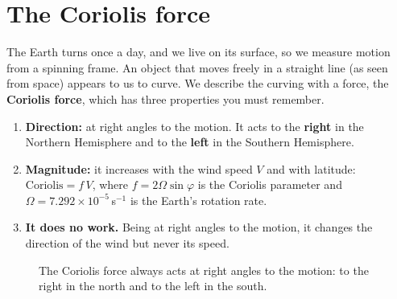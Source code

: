 \section{The Coriolis force}

The Earth turns once a day, and we live on its surface, so we measure motion from a spinning frame. An object that moves freely in a straight line (as seen from space) appears to us to curve. We describe the curving with a force, the \textbf{Coriolis force}, which has three properties you must remember.

\begin{enumerate}[label=\textbf{\arabic*.},itemsep=2pt]
\item \textbf{Direction:} at right angles to the motion. It acts to the \textbf{right} in the Northern Hemisphere and to the \textbf{left} in the Southern Hemisphere.
\item \textbf{Magnitude:} it increases with the wind speed $V$ and with latitude: $\text{Coriolis}=f\,V$, where $f=2\Omega\sin\varphi$ is the Coriolis parameter and $\Omega=7.292\times10^{-5}$\,s$^{-1}$ is the Earth's rotation rate.
\item \textbf{It does no work.} Being at right angles to the motion, it changes the direction of the wind but never its speed.
\end{enumerate}

\begin{figure}[ht]
\centering
\begin{minipage}{0.48\textwidth}
\centering
{}
\end{minipage}
\begin{minipage}{0.48\textwidth}
\centering
{}
\end{minipage}
\caption{The Coriolis force always acts at right angles to the motion: to the right in the north and to the left in the south.}
\end{figure}

